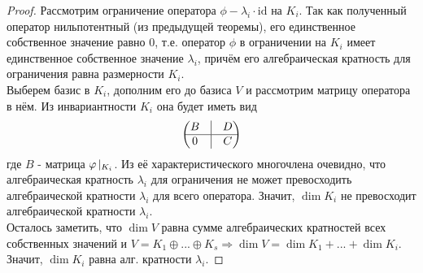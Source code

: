     \begin{proof}
        Рассмотрим ограничение оператора $\phi - \lambda_i\cdot\text{id}$ на $K_i$. Так как полученный оператор нильпотентный (из предыдущей теоремы), его единственное собственное значение равно $0$, т.е. оператор $\phi$ в ограничении на $K_i$ имеет единственное собственное значение $\lambda_i$, причём его алгебраическая кратность для ограничения равна размерности $K_i$.\\
        Выберем базис в $K_i$, дополним его до базиса $V$ и рассмотрим матрицу оператора в нём. Из инвариантности $K_i$ она будет иметь вид 
        $$\begin{pmatrix}
            B & \vline & D \\ \hline 0 & \vline & C
        \end{pmatrix}$$
        где $B$ - матрица $\phi \hspace{0.05cm} |_{K_i}$. Из её характеристического многочлена очевидно, что алгебраическая кратность $\lambda_i$ для ограничения не может превосходить алгебраической кратности $\lambda_i$ для всего оператора. Значит, $\dim K_i$ не превосходит алгебраической кратности $\lambda_i$.\\
        Осталось заметить, что $\dim V$ равна сумме алгебраических кратностей всех собственных значений и $V = K_1 \oplus ... \oplus K_s \Rightarrow \dim V = \dim K_1 + ... + \dim K_i$. Значит, $\dim K_i$ равна алг. кратности $\lambda_i$.      
    \end{proof}